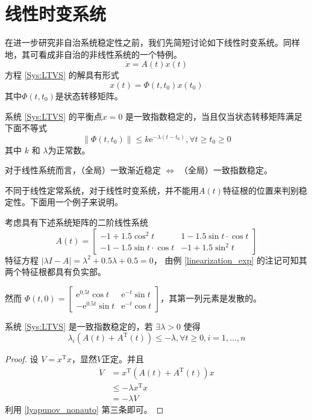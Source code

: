 \section{线性时变系统}\label{3Dref}
在进一步研究非自治系统稳定性之前，我们先简短讨论如下线性时变系统。同样地，其可看成非自治的非线性系统的一个特例。
\begin{equation}
  \dot{x} = A (t) x(t) \label{Sys:LTVS}
\end{equation}
方程 \eqref{Sys:LTVS} 的解具有形式
\[ x (t) = \Phi (t, t_0) x (t_0) \]
其中$\Phi (t, t_0)$是状态转移矩阵。

\begin{theorem}
 系统 \eqref{Sys:LTVS} 的平衡点$x = 0$ 是一致指数稳定的，当且仅当状态转移矩阵满足下面不等式
  \[ \| \Phi (t, t_0) \| \leq k  \mathrm{e}^{- \lambda (t - t_0)}, \forall t \geq t_0
     \geq 0 \]
  其中 $k$ 和 $\lambda$为正常数。
\end{theorem}
\begin{note}
  对于线性系统而言，（全局）一致渐近稳定 $\iff$ （全局）一致指数稳定。
\end{note}
不同于线性定常系统，对于线性时变系统，并不能用$A (t)$特征根的位置来判别稳定性。下面用一个例子来说明。
\begin{example}
  考虑具有下述系统矩阵的二阶线性系统
  \[ A (t) = \left[\begin{array}{cc}
       - 1 + 1.5 \cos^2 t & 1 - 1.5 \sin  t \cdot \cos  t\\
       - 1 - 1.5 \sin  t \cdot \cos  t & - 1 + 1.5 \sin^2 t
     \end{array}\right] \]
 特征方程 $| \lambda I - A | = \lambda^2 + 0.5 \lambda + 0.5 = 0$，
 由例 \ref{linearization_exp} 的注记可知其两个特征根都具有负实部。
  
  然而 $\Phi (t, 0) = \left[\begin{array}{cc}
    \mathrm{e}^{0.5 t} \cos  t & \mathrm{e}^{- t} \sin  t\\
    -\mathrm{e}^{0.5 t} \sin  t & \mathrm{e}^{- t} \cos  t
  \end{array}\right]$，其第一列元素是发散的。
\end{example}

\begin{corollary}\label{ltvs_lambda}
  系统 \eqref{Sys:LTVS} 是一致指数稳定的，若 $\exists \lambda > 0$ 使得
  \[ \lambda_i (A (t) + A^\mathrm{T} (t)) \leq - \lambda, \forall t \geq 0, i = 1,
     \ldots, n \]
\end{corollary}
\begin{proof}
    设 $V = x^\mathrm{T} x$，显然$V$正定。并且
  \begin{align*}
    \dot{V} & =  x^\mathrm{T} (A (t) + A^\mathrm{T} (t)) x\\
    & \leq  - \lambda x^\mathrm{T} x\\
    & =  - \lambda V
  \end{align*}
  利用 \ref{lyapunov_nonauto} 第三条即可。
\end{proof}

